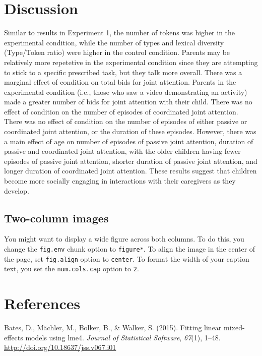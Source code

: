 \documentclass[10pt, letterpaper]{article}
\begin{document}
\section{Discussion}\label{discussion-1}

Similar to results in Experiment 1, the number of tokens was higher in
the experimental condition, while the number of types and lexical
diversity (Type/Token ratio) were higher in the control condition.
Parents may be relatively more repetetive in the experimental condition
since they are attempting to stick to a specific prescribed task, but
they talk more overall. There was a marginal effect of condition on
total bids for joint attention. Parents in the experimental condition
(i.e., those who saw a video demonstrating an activity) made a greater
number of bids for joint attention with their child. There was no effect
of condition on the number of episodes of coordinated joint attention.
There was no effect of condition on the number of episodes of either
passive or coordinated joint attention, or the duration of these
episodes. However, there was a main effect of age on number of episodes
of passive joint attention, duration of passive and coordinated joint
attention, with the older children having fewer episodes of passive
joint attention, shorter duration of passive joint attention, and longer
duration of coordinated joint attention. These results suggest that
children become more socially engaging in interactions with their
caregivers as they develop.

\subsection{Two-column images}\label{two-column-images}

You might want to display a wide figure across both columns. To do this,
you change the \texttt{fig.env} chunk option to \texttt{figure*}. To
align the image in the center of the page, set \texttt{fig.align} option
to \texttt{center}. To format the width of your caption text, you set
the \texttt{num.cols.cap} option to \texttt{2}.

\section{References}\label{references}

\setlength{\parindent}{-0.1in} \setlength{\leftskip}{0.125in} \noindent

\hypertarget{refs}{}
\hypertarget{ref-lme4}{}
Bates, D., Mächler, M., Bolker, B., \& Walker, S. (2015). Fitting linear
mixed-effects models using lme4. \emph{Journal of Statistical Software},
\emph{67}(1), 1--48. \url{http://doi.org/10.18637/jss.v067.i01}
\end{document}
